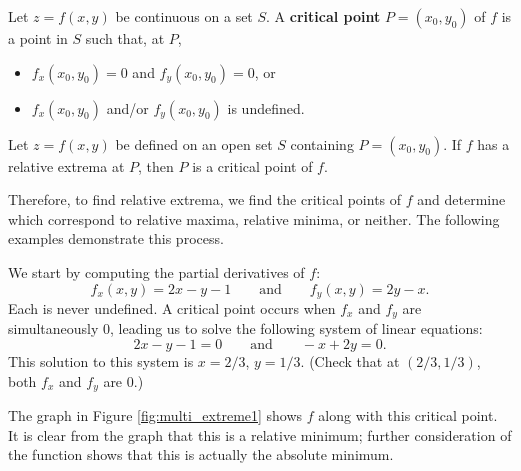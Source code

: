 {Let $z = f(x,y)$ be continuous on a set $S$. A \textbf{critical point} $P=(x_0,y_0)$ of $f$ is a point in $S$ such that, at $P$,
\begin{itemize}
	\item $f_x(x_0,y_0) = 0$ and $f_y(x_0,y_0) = 0$, or
	\item	$f_x(x_0,y_0)$ and/or $f_y(x_0,y_0)$ is undefined.
\end{itemize}
}

{Let $z=f(x,y)$ be defined on an open set $S$ containing $P=(x_0,y_0)$. If $f$ has a relative extrema at $P$, then $P$ is a critical point of $f$.
}

Therefore, to find relative extrema, we find the critical points of $f$ and determine which correspond to relative maxima, relative minima, or neither. The following examples demonstrate this process.\\

{We start by computing the partial derivatives of $f$:
$$f_x(x,y) = 2x-y-1 \qquad \text{and}\qquad f_y(x,y) = 2y-x.$$
Each is never undefined. A critical point occurs when $f_x$ and $f_y$ are simultaneously 0, leading us to solve the following system of linear equations:
$$2x-y-1 = 0\qquad \text{and}\qquad -x+2y = 0.$$
This solution to this system is $x=2/3$, $y=1/3$. (Check that at $(2/3,1/3)$, both $f_x$ and $f_y$ are 0.)

The graph in Figure \ref{fig:multi_extreme1} shows $f$ along with this critical point. It is clear from the graph that this is a relative minimum; further consideration of the function shows that this is actually the absolute minimum.
}\\

